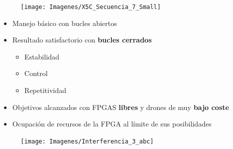 \documentclass[a4,landscpae]{seminar}
\begin{document}
\begin{hslide}
\begin{center}
	\begin{figure}
		\texttt{[image: Imagenes/X5C\_Secuencia\_7\_Small]}
	\end{figure} \hfill
\end{center}
\end{hslide}



\begin{hslide}
\begin{minipage}{8cm}
	\begin{itemize}
		\item Manejo b\'asico con bucles abiertos
		\item Resultado satisfactorio con \textbf{bucles cerrados}
			\begin{itemize}
				\item Estabilidad
				\item Control
				\item Repetitividad
			\end{itemize}
		\item Objetivos alcanzados con FPGAS \textbf{libres} y drones de muy \textbf{bajo coste}
		\item Ocupaci\'on de recursos de la FPGA al l\'imite de sus posibilidades
	\end{itemize}
\end{minipage} \hfill
\begin{minipage}{2cm}
	\begin{center}
		\begin{figure}
			\texttt{[image: Imagenes/Interferencia\_3\_abc]}
		\end{figure}
	\end{center}
\end{minipage} \hfill
\end{hslide}
\end{document}
